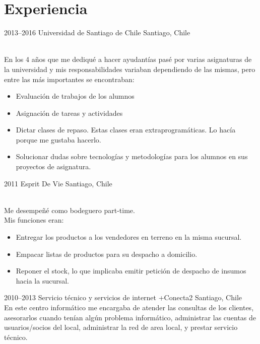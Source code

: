 \section{Experiencia}

\begin{entrylist}
  \entry
    {2013--2016}
    {Universidad de Santiago de Chile}
    {Santiago, Chile}
    {\\
    En los 4 años que me dediqué a hacer ayudantías pasé por varias asignaturas 
    de la universidad y mis responsabilidades variaban dependiendo de las 
    mismas, pero entre las más importantes se encontraban:\\
    \begin{itemize}
      \item Evaluación de trabajos de los alumnos
      \item Asignación de tareas y actividades
      \item Dictar clases de repaso. Estas clases eran extraprogramáticas. Lo 
        hacía porque me gustaba hacerlo.
      \item Solucionar dudas sobre tecnologías y metodologías para los alumnos en 
        sus proyectos de asignatura.
    \end{itemize}}
  \entry
    {2011}
    {Esprit De Vie}
    {Santiago, Chile}
    {\\
    Me desempeñé como bodeguero part-time.\\
    Mis funciones eran:
    \begin{itemize}
      \item Entregar los productos a los vendedores en terreno en la misma sucursal.
      \item Empacar listas de productos para su despacho a domicilio.
      \item Reponer el stock, lo que implicaba emitir petición de despacho de insumos hacia la sucursal.
    \end{itemize}}
  \entry
    {2010--2013}
    {Servicio técnico y servicios de internet +Conecta2}
    {Santiago, Chile}
    {\\
    En este centro informático me encargaba de atender las consultas de los 
    clientes, asesorarlos cuando tenían algún problema informático, 
    administrar las cuentas de usuarios/socios del local, administrar la red 
    de area local, y prestar servicio técnico.}
\end{entrylist}
